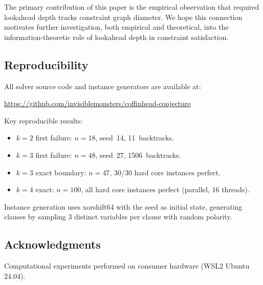 \documentclass[11pt,a4paper]{article}
\begin{document}
The primary contribution of this paper is the empirical observation that required lookahead depth tracks constraint graph diameter. We hope this connection motivates further investigation, both empirical and theoretical, into the information-theoretic role of lookahead depth in constraint satisfaction.

\subsection*{Reproducibility}

All solver source code and instance generators are available at:

\begin{center}
\url{https://github.com/invisiblemonsters/coffinhead-conjecture}
\end{center}

Key reproducible results:
\begin{itemize}
    \item $k=2$ first failure: $n=18$, seed~14, 11~backtracks.
    \item $k=3$ first failure: $n=48$, seed~27, 1506~backtracks.
    \item $k=3$ exact boundary: $n=47$, 30/30 hard core instances perfect.
    \item $k=4$ exact: $n=100$, all hard core instances perfect (parallel, 16 threads).
\end{itemize}
Instance generation uses xorshift64 with the seed as initial state, generating clauses by sampling 3 distinct variables per clause with random polarity.

\subsection*{Acknowledgments}

Computational experiments performed on consumer hardware (WSL2 Ubuntu 24.04).



\end{document}
